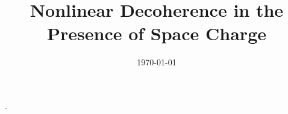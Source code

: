 \documentclass[aps,prstab,twocolumn, groupedaddress]{revtex4-1}
\begin{document}

\title{Nonlinear Decoherence in the Presence of Space Charge}


\author{}
\affiliation{}


\date{\today}

\begin{abstract}
\end{abstract}-

\pacs{}

\maketitle


\end{document}
